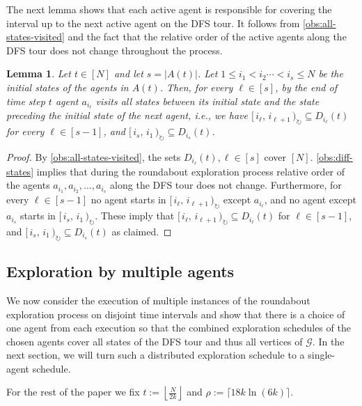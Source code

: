 \documentclass[a4paper,11pt]{article}
\newtheorem{lemma}[theorem]{Lemma}
\theoremstyle{definition}
\theoremstyle{remark}
\newcommand{\cG}{\ensuremath{\mathcal{G}}}
\newcommand{\coint}[2]{[\,#1,\,#2\,)_{\circlearrowright}}
\begin{document}
    The next lemma shows that each active agent is responsible for covering the interval up to the next active agent on the DFS tour. It follows from \cref{obs:all-states-visited} and the fact that the relative order of the active agents along the DFS tour does not change throughout the process.
	
	\begin{lemma}\label{cl:interval-cover}
		Let $t \in [N]$ and let $s = |A(t)|$. Let $1 \leq i_1 < i_2 \cdots < i_s \leq  N$ be the initial states of the agents in $A(t)$.
		Then, for every $\ell \in [s]$, by the end of time step $t$ agent $a_{i_{\ell}}$ visits all states between its initial state and the state preceding the initial state of the next agent, i.e., we have $\coint{i_{\ell}}{i_{\ell+1}} \subseteq D_{i_{\ell}}(t)$  for every ${\ell} \in [s-1]$, and $\coint{i_s}{i_1} \subseteq D_{i_s}(t)$.
	\end{lemma}
	\begin{proof}
		By \cref{obs:all-states-visited}, the sets $D_{i_{\ell}}(t), \ell \in [s]$ cover $[N]$. \cref{obs:diff-states} implies that during the roundabout exploration process relative order of the agents $a_{i_1}, a_{i_2}, \ldots, a_{i_s}$ along the DFS tour does not change. Furthermore, for every $\ell \in [s-1]$ no agent starts in $\coint{i_{\ell}}{i_{\ell+1}}$ except $a_{i_{\ell}}$, and no agent except $a_{i_s}$ starts in $\coint{i_s}{i_1}$. These imply that $\coint{i_{\ell}}{i_{\ell+1}} \subseteq D_{i_{\ell}}(t)$ for $\ell \in [s-1]$, and $\coint{i_s}{i_{1}} \subseteq D_{i_s}(t)$ as claimed.
	\end{proof}


	\subsection{Exploration by multiple agents}\label{sec:patroling-agents}

	We now consider the execution of multiple instances of the roundabout exploration process on disjoint time intervals and show that there is a choice of one agent from each execution so that the combined exploration schedules of the chosen agents cover all states of the DFS tour and thus all vertices of $\cG$. In the next section, we will turn such a distributed exploration schedule to a single-agent schedule.
	
	For the rest of the paper we fix $t := \left\lfloor \frac{N}{2k} \right\rfloor$ and $\rho := \lceil 18k \ln{(6k)} \rceil$.
\end{document}
